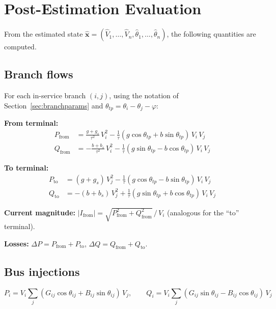 \documentclass[11pt,a4paper]{article}
\begin{document}

\section{Post-Estimation Evaluation}\label{sec:post}

From the estimated state $\hat{\mathbf{x}} = (\hat{V}_1,\ldots,\hat{V}_n,
\hat{\theta}_1,\ldots,\hat{\theta}_n)$, the following quantities are
computed.

\subsection{Branch flows}

For each in-service branch $(i,j)$, using the notation of
Section~\ref{sec:branchparams} and $\theta_{tp} = \theta_i - \theta_j - \varphi$:

\textbf{From terminal:}
\begin{align}
  P_\text{from} &= \frac{g+g_s}{\tau^2}\,V_i^2
    - \frac{1}{\tau}(g\cos\theta_{tp} + b\sin\theta_{tp})\,V_i\,V_j \\
  Q_\text{from} &= -\frac{b+b_s}{\tau^2}\,V_i^2
    - \frac{1}{\tau}(g\sin\theta_{tp} - b\cos\theta_{tp})\,V_i\,V_j
\end{align}

\textbf{To terminal:}
\begin{align}
  P_\text{to} &= (g+g_s)\,V_j^2
    - \frac{1}{\tau}(g\cos\theta_{tp} - b\sin\theta_{tp})\,V_i\,V_j \\
  Q_\text{to} &= -(b+b_s)\,V_j^2
    + \frac{1}{\tau}(g\sin\theta_{tp} + b\cos\theta_{tp})\,V_i\,V_j
\end{align}

\textbf{Current magnitude:}
$|I_\text{from}| = \sqrt{P_\text{from}^2 + Q_\text{from}^2}\,/\,V_i$
(analogous for the ``to'' terminal).

\textbf{Losses:}
$\Delta P = P_\text{from} + P_\text{to}$,\;
$\Delta Q = Q_\text{from} + Q_\text{to}$.

\subsection{Bus injections}

\begin{equation}
  P_i = V_i \sum_j (G_{ij}\cos\theta_{ij} + B_{ij}\sin\theta_{ij})\,V_j,
  \qquad
  Q_i = V_i \sum_j (G_{ij}\sin\theta_{ij} - B_{ij}\cos\theta_{ij})\,V_j
\end{equation}
\end{document}
